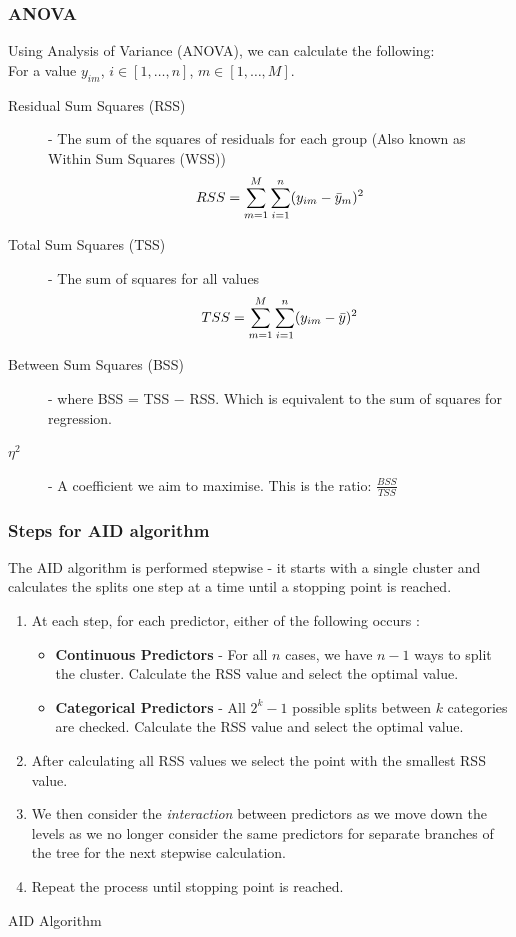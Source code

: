 \documentclass[11pt,a4paper]{report}
\begin{document}
\subsubsection{ANOVA}
Using Analysis of Variance (ANOVA), we can calculate the following:
\medskip\\
For a value $y_{im}$, $i \in [1,\dots,n]$, $m \in [1,\dots,M]$.
\begin{description}
    \item[Residual Sum Squares (RSS)] - The sum of the squares of residuals for each group (Also known as Within Sum Squares (WSS))
    \begin{equation}
        RSS = \sum_{m=1}^{M} \sum_{i=1}^{n} (y_{im} - \Bar{y}_{m})^{2}
        \label{eq:RSS}
    \end{equation}
    \item[Total Sum Squares (TSS)] - The sum of squares for all values
    \[
        TSS = \sum_{m=1}^{M} \sum_{i=1}^{n} (y_{im} - \Bar{y})^{2}
    \]
    \item[Between Sum Squares (BSS)] - where BSS = TSS $-$ RSS. Which is equivalent to the sum of squares for regression.
    \item[\textbf{$\eta^2$}] - A coefficient we aim to maximise. This is the ratio: $\frac{BSS}{TSS}$
\end{description}

\subsubsection{Steps for AID algorithm}
The AID algorithm is performed stepwise - it starts with a single cluster and calculates the splits one step at a time until a stopping point is reached. 
\begin{algorithm}
\begin{enumerate}
    \item At each step, for each predictor, either of the following occurs \cite{WilkinsonAID}:
    \begin{itemize}
        \item \textbf{Continuous Predictors} - For all $n$ cases, we have $n-1$ ways to split the cluster.
        Calculate the RSS value and select the optimal value.
    
        \item \textbf{Categorical Predictors} - All $2^{k} - 1$ possible splits between $k$ categories are checked.
        Calculate the RSS value and select the optimal value.
    \end{itemize}
    \item After calculating all RSS values we select the point with the smallest RSS value.

    \item We then consider the \textit{interaction} between predictors as we move down the levels as we no longer consider the same predictors for separate branches of the tree for the next stepwise calculation.
    
    \item Repeat the process until stopping point is reached.
\end{enumerate}
\caption{AID Algorithm}
\end{algorithm}
\end{document}
